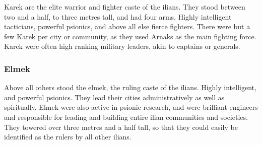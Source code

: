 Karek are the elite warrior and fighter caste of the ilians. They stood between
two and a half, to three metres tall, and had four arms. Highly intelligent
tacticians, powerful psionics, and above all else fierce fighters. There were
but a few Karek per city or community, as they used Arnaks as the main fighting
force. Karek were often high ranking military leaders, akin to captains or
generals.

\subsubsection{Elmek}
\label{sec:Elmek}

Above all others stood the elmek, the ruling caste of the ilians. Highly
intelligent, and powerful psionics. They lead their cities administratively as
well as spiritually. Elmek were also active in psionic research, and were
brilliant engineers and responsible for leading and building entire ilian
communities and societies. They towered over three metres and a half tall,
so that they could easily be identified as the rulers by all other ilians.
